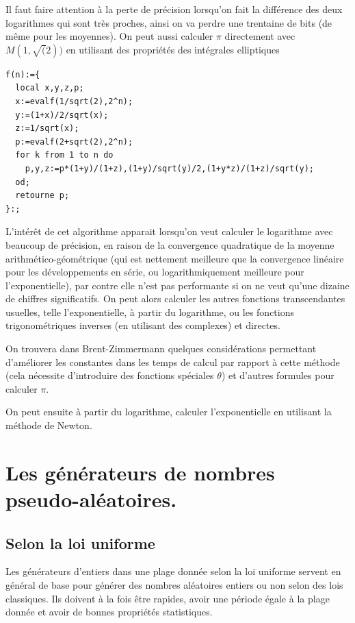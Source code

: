 \documentclass[a4paper,11pt]{article}
\begin{document}
\begin{giacjshere}
Il faut faire attention \`a la perte de pr\'ecision lorsqu'on fait
la diff\'erence des deux logarithmes qui sont tr\`es proches, ainsi
on va perdre une trentaine de bits (de m\^eme pour les moyennes).
On peut aussi calculer $\pi$ directement avec $M(1,\sqrt(2))$ en
utilisant des propri\'et\'es des int\'egrales elliptiques
\begin{verbatim}
f(n):={
  local x,y,z,p;
  x:=evalf(1/sqrt(2),2^n);
  y:=(1+x)/2/sqrt(x);
  z:=1/sqrt(x);
  p:=evalf(2+sqrt(2),2^n);
  for k from 1 to n do
    p,y,z:=p*(1+y)/(1+z),(1+y)/sqrt(y)/2,(1+y*z)/(1+z)/sqrt(y);
  od;
  retourne p;
}:;
\end{verbatim}

L'int\'er\^et de cet algorithme apparait lorsqu'on veut calculer
le logarithme avec beaucoup de pr\'ecision, en raison de la
convergence quadratique de la moyenne arithm\'etico-g\'eom\'etrique
(qui est nettement meilleure que la convergence lin\'eaire
pour les d\'eveloppements en s\'erie, ou logarithmiquement
meilleure pour l'exponentielle), par contre elle n'est pas
performante si on ne veut qu'une dizaine de chiffres significatifs. 
On peut alors calculer les autres
fonctions transcendantes usuelles, telle l'exponentielle,
\`a partir du logarithme, ou les fonctions trigonom\'etriques
inverses (en utilisant des complexes) et directes.

On trouvera dans Brent-Zimmermann quelques consid\'erations permettant
d'am\'eliorer les constantes dans les temps de calcul par rapport
\`a cette m\'ethode (cela n\'ecessite d'introduire des fonctions 
sp\'eciales $\theta$) et d'autres formules pour calculer $\pi$.

On peut ensuite \`a partir du logarithme, calculer l'exponentielle
en utilisant la m\'ethode de Newton.

\section{Les générateurs de nombres pseudo-aléatoires.}
\label{sec:random}
\subsection{Selon la loi uniforme}
Les générateurs d'entiers dans une plage donnée selon la loi
uniforme servent en général de base pour générer des 
nombres aléatoires entiers ou non selon des lois classiques.
Ils doivent à la fois être rapides, avoir une période égale à
la plage donnée et avoir de bonnes propriétés statistiques.


\end{giacjshere}
\end{document}
